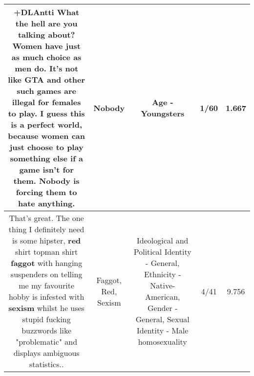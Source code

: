 \documentclass[11pt]{article}
\newlength\mylength
\begin{document}
\begin{center}
\begin{longtable}{|C{.65\mylength}|C{.30\mylength}|C{.12\mylength}|C{.12\mylength}|C{.12\mylength}|}
  \small +DLAntti What the hell are you talking about? Women have just as much choice as men do. It's not like GTA and other such games are illegal for females to play. I guess this is a perfect world, because women can just choose to play something else if a game isn't for them. \textbf{Nobody} is forcing them to hate anything.\normalsize   & Nobody & Age - Youngsters & 1/60 & 1.667 \\  \hline
  \small That's great. The one thing I definitely need is some hipster, \textbf{r\textbf{ed}} shirt topman shirt \textbf{faggot} with hanging suspenders on telling me my favourite hobby is infested with \textbf{sexism} whilst he uses stupid fucking buzzwords like "problematic" and displays ambiguous statistics..\normalsize   & Faggot, Red, Sexism &  Ideological and Political Identity - General, Ethnicity - Native-American, Gender - General, Sexual Identity - Male homosexuality & 4/41 & 9.756 \\  \hline

\end{longtable}
\end{center}
\end{document}
